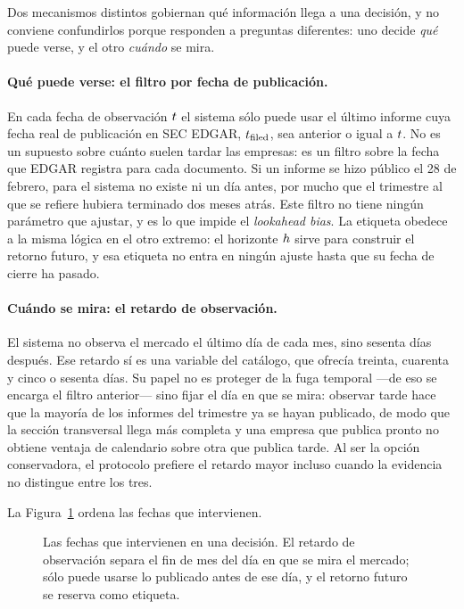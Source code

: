 Dos mecanismos distintos gobiernan qué información llega a una decisión, y no conviene
confundirlos porque responden a preguntas diferentes: uno decide \emph{qué} puede verse, y el otro
\emph{cuándo} se mira.

\paragraph{Qué puede verse: el filtro por fecha de publicación.} En cada fecha de observación
\(t\) el sistema sólo puede usar el último informe cuya fecha real de publicación en SEC EDGAR,
\(t_{\text{filed}}\), sea anterior o igual a \(t\). No es un supuesto sobre cuánto suelen tardar las
empresas: es un filtro sobre la fecha que EDGAR registra para cada documento. Si un informe se hizo
público el 28 de febrero, para el sistema no existe ni un día antes, por mucho que el trimestre al
que se refiere hubiera terminado dos meses atrás. Este filtro no tiene ningún parámetro que
ajustar, y es lo que impide el \textit{lookahead bias}. La etiqueta obedece a la misma lógica en el
otro extremo: el horizonte \(h\) sirve para construir el retorno futuro, y esa etiqueta no
entra en ningún ajuste hasta que su fecha de cierre ha pasado.

\paragraph{Cuándo se mira: el retardo de observación.} El sistema no observa el mercado el último
día de cada mes, sino sesenta días después. Ese retardo sí es una variable del catálogo, que ofrecía
treinta, cuarenta y cinco o sesenta días. Su papel no es proteger de la fuga temporal ---de eso se
encarga el filtro anterior--- sino fijar el día en que se mira: observar tarde hace que la mayoría
de los informes del trimestre ya se hayan publicado, de modo que la sección transversal llega más
completa y una empresa que publica pronto no obtiene ventaja de calendario sobre otra que publica
tarde. Al ser la opción conservadora, el protocolo prefiere el retardo mayor incluso cuando la
evidencia no distingue entre los tres.

La Figura~\ref{fig:observabilidad} ordena las fechas que intervienen.

\begin{figure}[htbp]
\centering
{}
\caption{Las fechas que intervienen en una decisión. El retardo de observación separa el fin de mes
del día en que se mira el mercado; sólo puede usarse lo publicado antes de ese día, y el retorno
futuro se reserva como etiqueta.}
\label{fig:observabilidad}
\end{figure}

